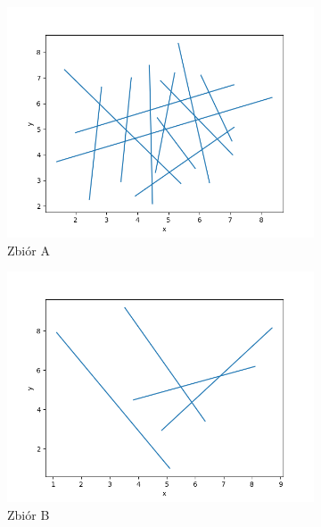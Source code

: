 \documentclass[11pt,a4paper]{article}
\begin{document}
\begin{figure}[H]
    \centering
    \begin{subfigure}[b]{0.46\textwidth}
        \centering
        \includegraphics[scale=0.4]{res/sec_a.png}
        \caption{
            Zbiór A
        }
    \end{subfigure}
    \begin{subfigure}[b]{0.46\textwidth}
        \centering
        \includegraphics[scale=0.4]{res/sec_b.png}
        \caption{
            Zbiór B
        }
    \end{subfigure}
    \begin{subfigure}[b]{0.46\textwidth}
        \centering

\end{subfigure}
\end{figure}
\end{document}
